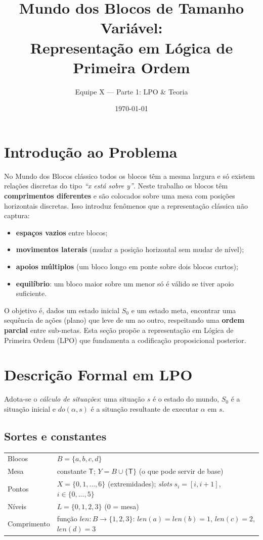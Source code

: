 \documentclass[11pt,a4paper]{article}
\title{Mundo dos Blocos de Tamanho Variável:\\Representação em Lógica de Primeira Ordem}
\author{Equipe X --- Parte 1: LPO \& Teoria}
\date{\today}
\newcommand{\Len}{\mathit{len}}
\newcommand{\Do}{\mathit{do}}
\newcommand{\Mesa}{\mathsf{T}}
\begin{document}
\maketitle

\section{Introdução ao Problema}

No Mundo dos Blocos clássico todos os blocos têm a mesma largura e só existem relações discretas do tipo \emph{``x está sobre y''}. Neste trabalho os blocos têm \textbf{comprimentos diferentes} e são colocados sobre uma mesa com posições horizontais discretas. Isso introduz fenômenos que a representação clássica não captura:
\begin{itemize}
  \item \textbf{espaços vazios} entre blocos;
  \item \textbf{movimentos laterais} (mudar a posição horizontal sem mudar de nível);
  \item \textbf{apoios múltiplos} (um bloco longo em ponte sobre dois blocos curtos);
  \item \textbf{equilíbrio}: um bloco maior sobre um menor só é válido se tiver apoio suficiente.
\end{itemize}
O objetivo é, dados um estado inicial $S_0$ e um estado meta, encontrar uma sequência de ações (plano) que leve de um ao outro, respeitando uma \textbf{ordem parcial} entre sub-metas. Esta seção propõe a representação em Lógica de Primeira Ordem (LPO) que fundamenta a codificação proposicional posterior.

\section{Descrição Formal em LPO}

Adota-se o \emph{cálculo de situações}: uma situação $s$ é o estado do mundo, $S_0$ é a situação inicial e $\Do(\alpha,s)$ é a situação resultante de executar $\alpha$ em $s$.

\subsection{Sortes e constantes}

\begin{tabular}{@{}ll@{}}
Blocos & $B=\{a,b,c,d\}$ \\
Mesa & constante $\Mesa$; $Y = B\cup\{\Mesa\}$ (o que pode servir de base) \\
Pontos & $X=\{0,1,\dots,6\}$ (extremidades); \emph{slots} $s_i=[i,i+1]$, $i\in\{0,\dots,5\}$ \\
Níveis & $L=\{0,1,2,3\}$ ($0$ = mesa) \\
Comprimento & função $\Len:B\to\{1,2,3\}$: $\Len(a)=\Len(b)=1$, $\Len(c)=2$, $\Len(d)=3$ \\
\end{tabular}
\end{document}
